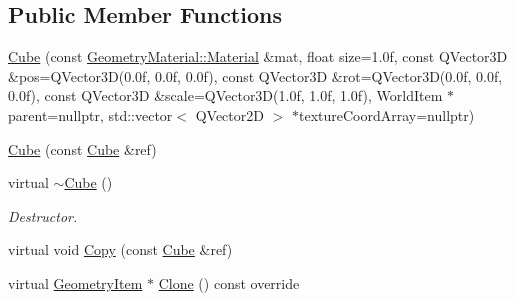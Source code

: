 \subsection*{Public Member Functions}
\begin{DoxyCompactItemize}
\item 
\mbox{\hyperlink{class_geometry_engine_1_1_geometry_world_item_1_1_geometry_item_1_1_cube_a17e32e15517c004eaaf5187d8c6bce4e}{Cube}} (const \mbox{\hyperlink{class_geometry_engine_1_1_geometry_material_1_1_material}{Geometry\+Material\+::\+Material}} \&mat, float size=1.\+0f, const Q\+Vector3\+D \&pos=\+Q\+Vector3\+D(0.\+0f, 0.\+0f, 0.\+0f), const Q\+Vector3\+D \&rot=\+Q\+Vector3\+D(0.\+0f, 0.\+0f, 0.\+0f), const Q\+Vector3\+D \&scale=\+Q\+Vector3\+D(1.\+0f, 1.\+0f, 1.\+0f), World\+Item $\ast$parent=nullptr, std\+::vector$<$ Q\+Vector2\+D $>$ $\ast$texture\+Coord\+Array=nullptr)
\item 
\mbox{\hyperlink{class_geometry_engine_1_1_geometry_world_item_1_1_geometry_item_1_1_cube_a159c3e7e79d19df2a9857fc6b77d5955}{Cube}} (const \mbox{\hyperlink{class_geometry_engine_1_1_geometry_world_item_1_1_geometry_item_1_1_cube}{Cube}} \&ref)
\item 
\mbox{\label{class_geometry_engine_1_1_geometry_world_item_1_1_geometry_item_1_1_cube_a08410ebbd8eb4adce0706505e0150ba1}} 
virtual \mbox{\hyperlink{class_geometry_engine_1_1_geometry_world_item_1_1_geometry_item_1_1_cube_a08410ebbd8eb4adce0706505e0150ba1}{$\sim$\+Cube}} ()
\begin{DoxyCompactList}\small\item\em Destructor. \end{DoxyCompactList}\item 
virtual void \mbox{\hyperlink{class_geometry_engine_1_1_geometry_world_item_1_1_geometry_item_1_1_cube_a36f20733aaadc9ab22a72eb87436b900}{Copy}} (const \mbox{\hyperlink{class_geometry_engine_1_1_geometry_world_item_1_1_geometry_item_1_1_cube}{Cube}} \&ref)
\item 
virtual \mbox{\hyperlink{class_geometry_engine_1_1_geometry_world_item_1_1_geometry_item_1_1_geometry_item}{Geometry\+Item}} $\ast$ \mbox{\hyperlink{class_geometry_engine_1_1_geometry_world_item_1_1_geometry_item_1_1_cube_ab151cd962c45bc06d21e9e26c2d1c4aa}{Clone}} () const override
\end{DoxyCompactItemize}

